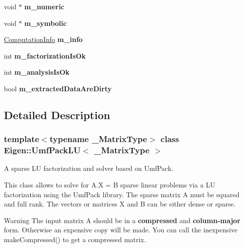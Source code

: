 \begin{DoxyCompactItemize}
\mbox{\label{class_eigen_1_1_umf_pack_l_u_a1934b9ac9f249d01a913b456221079f9}} 
void $\ast$ {\bfseries m\+\_\+numeric}
\item 
\mbox{\label{class_eigen_1_1_umf_pack_l_u_a56f5ff61923243ac2c7c67455a95304f}} 
void $\ast$ {\bfseries m\+\_\+symbolic}
\item 
\mbox{\label{class_eigen_1_1_umf_pack_l_u_abe14c88bdd4a2a8eb3acac209d57f78e}} 
\hyperlink{group__enums_ga85fad7b87587764e5cf6b513a9e0ee5e}{Computation\+Info} {\bfseries m\+\_\+info}
\item 
\mbox{\label{class_eigen_1_1_umf_pack_l_u_a2035de2dc3b834ffc761c8e689b2d6fb}} 
int {\bfseries m\+\_\+factorization\+Is\+Ok}
\item 
\mbox{\label{class_eigen_1_1_umf_pack_l_u_a709615cdd6a89ceb8bf072922adbc621}} 
int {\bfseries m\+\_\+analysis\+Is\+Ok}
\item 
\mbox{\label{class_eigen_1_1_umf_pack_l_u_a9611324e2e3f3ab0e643c91651661750}} 
bool {\bfseries m\+\_\+extracted\+Data\+Are\+Dirty}
\end{DoxyCompactItemize}


\subsection{Detailed Description}
\subsubsection*{template$<$typename \+\_\+\+Matrix\+Type$>$\newline
class Eigen\+::\+Umf\+Pack\+L\+U$<$ \+\_\+\+Matrix\+Type $>$}

A sparse LU factorization and solver based on Umf\+Pack. 

This class allows to solve for A.\+X = B sparse linear problems via a LU factorization using the Umf\+Pack library. The sparse matrix A must be squared and full rank. The vectors or matrices X and B can be either dense or sparse.

\begin{DoxyWarning}{Warning}
The input matrix A should be in a {\bfseries compressed} and {\bfseries column-\/major} form. Otherwise an expensive copy will be made. You can call the inexpensive make\+Compressed() to get a compressed matrix. 
\end{DoxyWarning}

